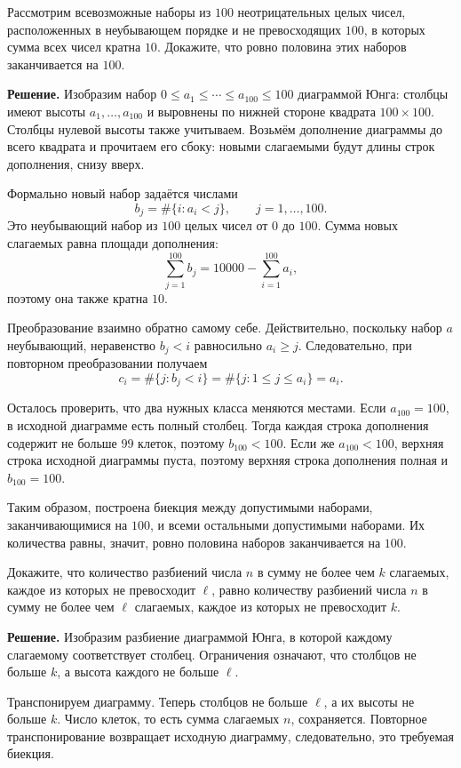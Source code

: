 \begin{problems}
\item Рассмотрим всевозможные наборы из $100$ неотрицательных целых чисел, расположенных в неубывающем порядке и не превосходящих $100$, в которых сумма всех чисел кратна $10$. Докажите, что ровно половина этих наборов заканчивается на $100$.
\par\smallskip\noindent\textbf{Решение.} Изобразим набор $0\le a_1\le\cdots\le a_{100}\le100$ диаграммой Юнга: столбцы имеют высоты $a_1,\ldots,a_{100}$ и выровнены по нижней стороне квадрата $100\times100$. Столбцы нулевой высоты также учитываем. Возьмём дополнение диаграммы до всего квадрата и прочитаем его сбоку: новыми слагаемыми будут длины строк дополнения, снизу вверх.
\par Формально новый набор задаётся числами
\[
b_j=\#\{i:a_i<j\},\qquad j=1,\ldots,100.
\]
Это неубывающий набор из $100$ целых чисел от $0$ до $100$. Сумма новых слагаемых равна площади дополнения:
\[
\sum_{j=1}^{100}b_j=10000-\sum_{i=1}^{100}a_i,
\]
поэтому она также кратна $10$.
\par Преобразование взаимно обратно самому себе. Действительно, поскольку набор $a$ неубывающий, неравенство $b_j<i$ равносильно $a_i\ge j$. Следовательно, при повторном преобразовании получаем
\[
c_i=\#\{j:b_j<i\}=\#\{j:1\le j\le a_i\}=a_i.
\]
\par Осталось проверить, что два нужных класса меняются местами. Если $a_{100}=100$, в исходной диаграмме есть полный столбец. Тогда каждая строка дополнения содержит не больше $99$ клеток, поэтому $b_{100}<100$. Если же $a_{100}<100$, верхняя строка исходной диаграммы пуста, поэтому верхняя строка дополнения полная и $b_{100}=100$.
\par Таким образом, построена биекция между допустимыми наборами, заканчивающимися на $100$, и всеми остальными допустимыми наборами. Их количества равны, значит, ровно половина наборов заканчивается на $100$.\par

\item Докажите, что количество разбиений числа $n$ в сумму не более чем $k$ слагаемых, каждое из которых не превосходит $\ell$, равно количеству разбиений числа $n$ в сумму не более чем $\ell$ слагаемых, каждое из которых не превосходит $k$.
\par\smallskip\noindent\textbf{Решение.} Изобразим разбиение диаграммой Юнга, в которой каждому слагаемому соответствует столбец. Ограничения означают, что столбцов не больше $k$, а высота каждого не больше $\ell$.
\par Транспонируем диаграмму. Теперь столбцов не больше $\ell$, а их высоты не больше $k$. Число клеток, то есть сумма слагаемых $n$, сохраняется. Повторное транспонирование возвращает исходную диаграмму, следовательно, это требуемая биекция.\par


\end{problems}
